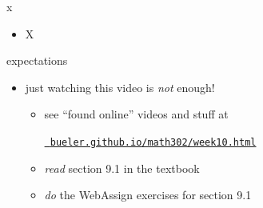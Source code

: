 \documentclass[urlcolor=blue,dvipsnames]{beamer}
\begin{document}
\begin{frame}{x}

\begin{itemize}
\item X
\end{itemize}
\end{frame}




\begin{frame}{expectations}

\begin{itemize}
\item just watching this video is \emph{not} enough!
     \begin{itemize}
     \item see ``found online'' videos and stuff at

     \centerline{\href{https://bueler.github.io/math302/week10.html}{\tt \color{cyan} bueler.github.io/math302/week10.html}}
     \item \emph{read} section 9.1 in the textbook
     \item \emph{do} the WebAssign exercises for section 9.1
     \end{itemize}
\end{itemize}
\end{frame}
\end{document}
